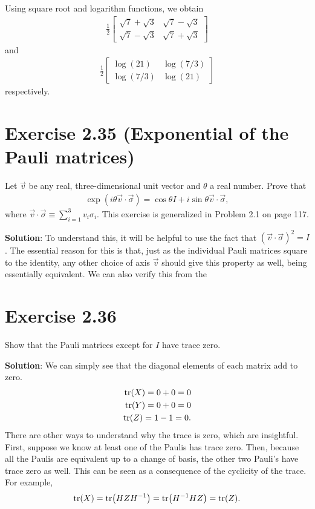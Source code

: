 \documentclass{book}
\begin{document}
    Using square root and logarithm functions, we obtain
    \begin{align}
        \frac{1}{2}\begin{bmatrix}
            \sqrt{7} + \sqrt{3} & \sqrt{7}-\sqrt{3} \\
            \sqrt{7}-\sqrt{3} & \sqrt{7} + \sqrt{3}
        \end{bmatrix}
    \end{align}
    and
    \begin{align}
        \frac{1}{2}\begin{bmatrix}
            \log(21) & \log(7/3) \\
            \log(7/3) & \log(21)
        \end{bmatrix}
    \end{align}
    respectively.
    
\section*{Exercise 2.35 (Exponential of the Pauli matrices)}
    Let $\vec{v}$ be any real, three-dimensional unit vector and $\theta$ a real number. Prove that
    \begin{align}
        \exp(i\theta \vec{v}\cdot \vec{\sigma}) = \cos \theta I + i \sin\theta \vec{v}\cdot\vec{\sigma},
    \end{align}
    where $\vec{v}\cdot\vec{\sigma}\equiv \sum_{i=1}^3 v_i\sigma_i$. This exercise is generalized in Problem 2.1 on page 117.

    \textbf{Solution}: To understand this, it will be helpful to use the fact that $(\vec{v}\cdot\vec{\sigma})^2 = I$. The essential reason for this is that, just as the individual Pauli matrices square to the identity, any other choice of axis $\vec{v}$ should give this property as well, being essentially equivalent. We can also verify this from the 
    
\section*{Exercise 2.36}
    Show that the Pauli matrices except for $I$ have trace zero.
    
    \textbf{Solution}: We can simply see that the diagonal elements of each matrix add to zero.
    \begin{align}
    \begin{aligned}
        \tr(X) = 0 + 0 = 0 \\
        \tr(Y) = 0 + 0 = 0 \\
        \tr(Z) = 1 - 1 = 0. 
    \end{aligned}
    \end{align}
    There are other ways to understand why the trace is zero, which are insightful. First, suppose we know at least one of the Paulis has trace zero. Then, because all the Paulis are equivalent up to a change of basis, the other two Pauli's have trace zero as well. This can be seen as a consequence of the cyclicity of the trace. For example,
    \begin{align}
        \tr(X) = \tr(H Z H^{-1}) = \tr( H^{-1} H Z) = \tr(Z).
    \end{align}
    
\end{document}
